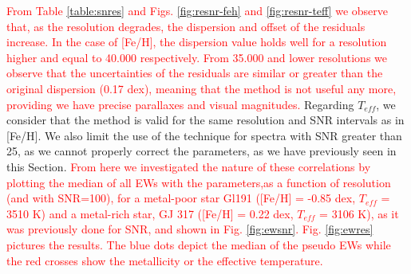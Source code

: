 \documentclass{aa}
\begin{document}
\textcolor{red}{From Table \ref{table:snres} and Figs. \ref{fig:resnr-feh} and \ref{fig:resnr-teff} we observe that, as the resolution degrades, the dispersion and offset of the residuals increase. In the case of [Fe/H], the dispersion value holds well for a resolution higher and equal to 40.000 respectively. From 35.000 and lower resolutions we observe that the uncertainties of the residuals are similar or greater than the original dispersion (0.17 dex), meaning that the method is not useful any more, providing we have precise parallaxes and visual magnitudes.} %
Regarding $T_{eff}$, we consider that the method is valid for the same resolution and SNR intervals as in [Fe/H]. We also limit the use of the technique for spectra with SNR greater than 25, as we cannot properly correct the parameters, as we have previously seen in this Section. %
\textcolor{red}{From here we investigated the nature of these correlations by plotting the median of all EWs with the parameters,as a function of resolution (and with SNR=100), for a metal-poor star Gl191 ([Fe/H] = -0.85 dex, $T_{eff}$ = 3510 K) and a metal-rich star, GJ 317 ([Fe/H] = 0.22 dex, $T_{eff}$ = 3106 K), as it was previously done for SNR, and shown in Fig. \ref{fig:ewsnr}. Fig. \ref{fig:ewres} pictures the results. The blue dots depict the median of the pseudo EWs while the red crosses show the metallicity or the effective temperature. }
\end{document}
